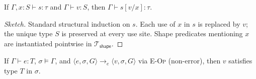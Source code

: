 \begin{lemma}[Substitution]\label{lem:substitution}
If $\Gamma,x{:}S\vdash s:\tau$ and $\Gamma\vdash v:S$,
then $\Gamma\vdash s[v/x]:\tau$.
\end{lemma}
\begin{proof}[Sketch]
Standard structural induction on $s$.
Each use of $x$ in $s$ is replaced by $v$; the unique type $S$ is preserved at
every use site.
Shape predicates mentioning $x$ are instantiated pointwise in
$\mathcal{T}_{\mathsf{shape}}$.
\end{proof}

\begin{lemma}\label{lem:reduction}
If $\Gamma\vdash e:T$, $\sigma\models\Gamma$, and
$\langle e,\sigma,G\rangle\to_e\langle v,\sigma,G\rangle$ via
\textsc{E-Op} (non-error), then $v$ satisfies type $T$ in $\sigma$.
\end{lemma}
